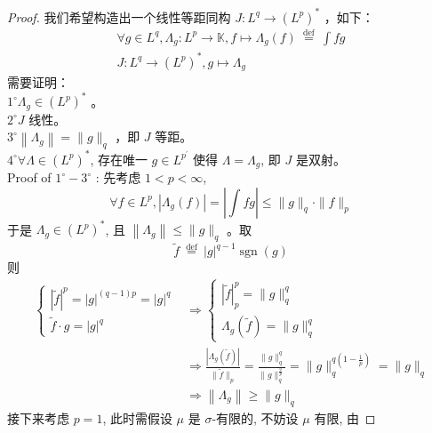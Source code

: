 \documentclass[lang=cn,newtx,10pt,scheme=chinese,thmcnt=chapter]{elegantbook}
\begin{document}
\begin{proof}
我们希望构造出一个线性等距同构 $J: L^q \rightarrow\left(L^p\right)^*$ ，如下：
\begin{equation*}
\begin{gathered}
\forall g \in L^q, \Lambda_g: L^p \rightarrow \mathbb{K} , f \mapsto \Lambda_g(f) \stackrel{\text { def }}{=} \int f g \\
J: L^q \rightarrow\left(L^p\right)^*, g \mapsto \Lambda_g
\end{gathered}
\end{equation*}
需要证明：\\
$1^{\circ} \Lambda_g \in\left(L^p\right)^*$ 。\\
$2^{\circ} J$ 线性。\\
$3^{\circ}\left\|\Lambda_g\right\|=\|g\|_q$ ，即 $J$ 等距。\\
$4^{\circ} \forall \Lambda \in\left(L^p\right)^*$, 存在唯一 $g \in L^{p^{\prime}}$ 使得 $\Lambda=\Lambda_g$, 即 $J$ 是双射。\\
Proof of $1^{\circ}-3^{\circ}$ : 先考虑 $1<p<\infty$,
\begin{equation*}
\forall f \in L^p,\left|\Lambda_g(f)\right|=\left|\int f g\right| \leqslant\|g\|_q \cdot\|f\|_p
\end{equation*}
于是 $\Lambda_g \in\left(L^p\right)^*$, 且 $\left\|\Lambda_g\right\| \leqslant\|g\|_q$ 。取
\begin{equation*}
\tilde{f} \stackrel{\text { def }}{=}|g|^{q-1} \operatorname{sgn}(g)
\end{equation*}
则
\begin{equation*}
\begin{aligned}
\left\{\begin{array}{l}
|\tilde{f}|^p=|g|^{(q-1) p}=|g|^q \\
\tilde{f} \cdot g=|g|^q
\end{array}\right. & \Rightarrow\left\{\begin{array}{l}
|\tilde{f}|_p^p=\|g\|_q^q \\
\Lambda_g(\tilde{f})=\|g\|_q^q
\end{array}\right. \\
& \Rightarrow \frac{\left|\Lambda_g(\tilde{f})\right|}{\|\tilde{f}\|_p}=\frac{\|g\|_q^q}{\|g\|_q^{\frac{q}{p}}}=\|g\|_q^{q\left(1-\frac{1}{p}\right)}=\|g\|_q \\
& \Rightarrow\left\|\Lambda_g\right\| \geqslant\|g\|_q
\end{aligned}
\end{equation*}
接下来考虑 $p=1$, 此时需假设 $\mu$ 是 $\sigma$-有限的, 不妨设 $\mu$ 有限, 由

\end{proof}
\end{document}

